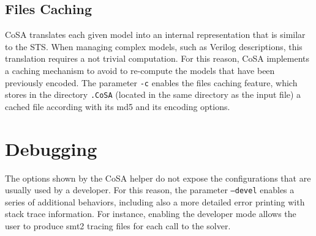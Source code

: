 \documentclass{article}
\theoremstyle{definition}
\begin{document}
\subsection{Files Caching}
CoSA translates each given model into an internal representation that
is similar to the STS. When managing complex models, such as Verilog
descriptions, this translation requires a not trivial computation. For
this reason, CoSA implements a caching mechanism to avoid to
re-compute the models that have been previously encoded. The parameter
\texttt{-c} enables the files caching feature, which stores in the
directory \texttt{.CoSA} (located in the same directory as the input
file) a cached file according with its md5 and its encoding options.

\section{Debugging}
\label{sec:debugging}

The options shown by the CoSA helper do not expose the configurations
that are usually used by a developer. For this reason, the parameter
\texttt{--devel} enables a series of additional behaviors, including
also a more detailed error printing with stack trace information. For
instance, enabling the developer mode allows the user to produce smt2
tracing files for each call to the solver.

\newpage


\end{document}
